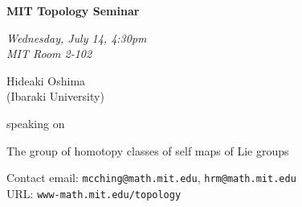\documentclass{slides}
\begin{document}
\begin{center}

{\fontsize {54pt}{40pt}\selectfont

\textrm{
{\textbf{MIT Topology Seminar}}}
}
\medskip


{\large\textrm{\emph{Wednesday, July 14, 4:30pm\\MIT Room 2-102}}}



\bigskip

\textrm{{\LARGE Hideaki Oshima  \\[.5cm](Ibaraki University)}}

\bigskip\bigskip\bigskip
\textrm{speaking on}
\bigskip\bigskip\bigskip

\textrm{\LARGE The group of homotopy classes of self maps of Lie groups}\\

\end{center}

\vspace{1cm}

{\small
\textrm{Contact email: } \texttt{mcching@math.mit.edu}, \texttt{hrm@math.mit.edu}\\
\textrm{URL: } \texttt{www-math.mit.edu/topology}
}
\end{document}
